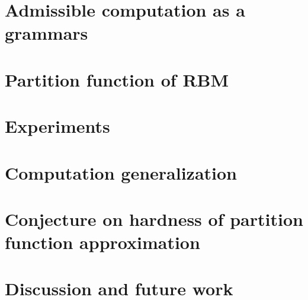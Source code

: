 \documentclass{article}
\begin{document}
\section{Admissible computation as a grammars}\label{sec:grammars}



\section{Partition function of RBM} \label{partitionfunction}


\section{Experiments}


\section{Computation generalization}\label{agenda}


\section{Conjecture on hardness of partition function approximation}


\section{Discussion and future work}



\nocite{*}


\end{document}
